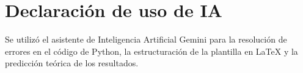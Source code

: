 \documentclass[11pt]{article}
\begin{document}
\section*{Declaración de uso de IA}
Se utilizó el asistente de Inteligencia Artificial Gemini para la resolución de errores en el código de Python, la estructuración de la plantilla en LaTeX y la predicción teórica de los resultados.




\nocite{*}


\end{document}
